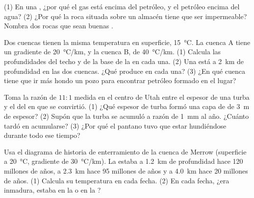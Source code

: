 \begin{exercise}[$\star$]\label{exo:g11:fossil-fuel-geology:5}
(1) En una , ¿por qué el gas está encima del petróleo, y el petróleo
encima del agua? (2) ¿Por qué la roca situada sobre un almacén tiene que ser
impermeable? Nombra dos rocas que sean buenas .
\end{exercise}

\begin{exercise}[$\star\star$]\label{exo:g11:fossil-fuel-geology:6}
Dos cuencas tienen la misma temperatura en superficie, \qty{15}{\degreeCelsius}.
La cuenca A tiene un gradiente de \qty{20}{\degreeCelsius/km}, y la cuenca B,
de \qty{40}{\degreeCelsius/km}. (1) Calcula las profundidades del techo y de
la base de la  en cada una. (2) Una  está a
\qty{2}{km} de profundidad en las dos cuencas. ¿Qué produce en cada una?
(3) ¿En qué cuenca tiene que ir más hondo un pozo para encontrar petróleo
formado en el lugar?
\end{exercise}

\begin{exercise}[$\star\star$]\label{exo:g11:fossil-fuel-geology:7}
Toma la razón de $11{:}1$ medida en el centro de Utah entre el espesor de una
turba y el del  en que se convirtió. (1) ¿Qué espesor de turba formó una
capa de  de \qty{3}{m} de espesor? (2) Supón que la turba se acumuló a
razón de \qty{1}{mm} al año. ¿Cuánto tardó en acumularse? (3) ¿Por qué el
pantano tuvo que estar hundiéndose durante todo ese tiempo?
\end{exercise}

\begin{exercise}[$\star\star$]\label{exo:g11:fossil-fuel-geology:8}
Usa el diagrama de historia de enterramiento de la cuenca de Merrow
(superficie a \qty{20}{\degreeCelsius}, gradiente de
\qty{30}{\degreeCelsius/km}). La  estaba a \qty{1.2}{km} de
profundidad hace 120 millones de años, a \qty{2.3}{km} hace 95 millones de
años y a \qty{4.0}{km} hace 20 millones de años. (1) Calcula su temperatura
en cada fecha. (2) En cada fecha, ¿era inmadura, estaba en la  o en la ?
\end{exercise}

